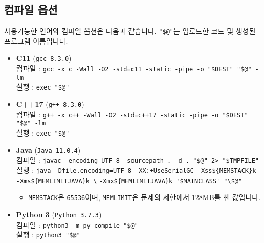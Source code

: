 \subsection*{컴파일 옵션}
사용가능한 언어와 컴파일 옵션은 다음과 같습니다. \verb|"$@"|는 업로드한 코드 및 생성된 프로그램 이름입니다.
\begin{itemize}
    \item \textbf{C11} (\texttt{gcc 8.3.0})\\
    컴파일 : \verb|gcc -x c -Wall -O2 -std=c11 -static -pipe -o "$DEST" "$@" -lm|\\
    실행 : \verb|exec "$@"|
    \item \textbf{C++17} (\texttt{g++ 8.3.0})\\
    컴파일 : \verb|g++ -x c++ -Wall -O2 -std=c++17 -static -pipe -o "$DEST" "$@" -lm|\\
    실행 : \verb|exec "$@"|
    \item \textbf{Java} (\texttt{Java 11.0.4})\\
    컴파일 : \verb|javac -encoding UTF-8 -sourcepath . -d . "$@" 2> "$TMPFILE"|\\
    실행 : \verb|java -Dfile.encoding=UTF-8 -XX:+UseSerialGC -Xss${MEMSTACK}k -Xms${MEMLIMITJAVA}k \|
    \verb|-Xmx${MEMLIMITJAVA}k '$MAINCLASS' "\$@"|
    \begin{itemize}
        \item \verb|MEMSTACK|은 \verb|65536|이며, \verb|MEMLIMIT|은 문제의 제한에서 128MB를 뺀 값입니다.
    \end{itemize}
    \item \textbf{Python 3} (\texttt{Python 3.7.3})\\
    컴파일 : \verb|python3 -m py_compile "$@"|\\
    실행 : \verb|python3 "$@"|
\end{itemize}